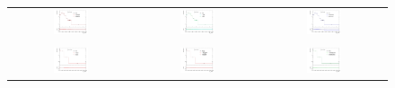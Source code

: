 \begin{figure}[!tpb]
\begin{center}
\begin{tabular}{ccc}
\includegraphics[width=0.30\textwidth]{Modeling/Figures/topPt/topPt_isrfsr} & %
\includegraphics[width=0.30\textwidth]{Modeling/Figures/topPt/topPt_jer} & %
\includegraphics[width=0.30\textwidth]{Modeling/Figures/topPt/topPt_mcgen} \\ 
\vspace{1cm} & & \\
\includegraphics[width=0.30\textwidth]{Modeling/Figures/ttbarPt/ttbarPt_bjes} & %
\includegraphics[width=0.30\textwidth]{Modeling/Figures/ttbarPt/ttbarPt_btageff} & %
\includegraphics[width=0.30\textwidth]{Modeling/Figures/ttbarPt/ttbarPt_closebyjes} \\ 

\end{tabular}
\end{center}
\end{figure}
